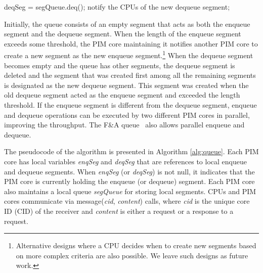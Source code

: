 \begin{algorithm*}[ht!]
{\begin{multicols}{2}
\begin{algorithmic}[1]
\algrestore{}
	\State deqSeg = segQueue.deq();
	\State notify the CPUs of the new dequeue segment; 
\EndProcedure
\end{algorithmic}

\end{multicols}
}
\vspace{-2ex}
\end{algorithm*}

Initially, the queue consists of an empty segment that acts as both the enqueue segment and 
the dequeue segment. 
When the length of the enqueue segment exceeds some threshold, the PIM core maintaining it
notifies another PIM core to create a new segment as the new enqueue segment.\footnote{
Alternative designs where a CPU decides when to create new segments based on more complex 
criteria are also possible. 
We leave such designs as future work. }
When the dequeue segment becomes empty and the queue has other segments, 
the dequeue segment is deleted and the segment that was created first 
among all the remaining segments is designated as the new dequeue segment. 
This segment was created when the old dequeue segment 
acted as the enqueue segment and exceeded the length threshold.
If the enqueue segment is different from the dequeue segment, 
enqueue and dequeue operations can be executed by two different PIM cores 
in parallel, improving the throughput. 
The F\&A queue~\cite{Morrison13} also allows parallel enqueue and dequeue. 

The pseudocode of the algorithm is presented in Algorithm \ref{alg:queue}. 
Each PIM core has local variables \textit{enqSeg} and \textit{deqSeg} that are references to 
local enqueue and dequeue segments.
When \textit{enqSeg} (or \textit{deqSeg}) is not null, it indicates that the PIM core is currently 
holding the enqueue (or dequeue) segment.
Each PIM core also maintains a local queue \textit{segQueue} for storing local segments.
CPUs and PIM cores communicate via message(\textit{cid}, \textit{content}) calls, 
where \textit{cid} is the unique core ID (CID) 
of the receiver and \textit{content} is either a request or a response to a request.

